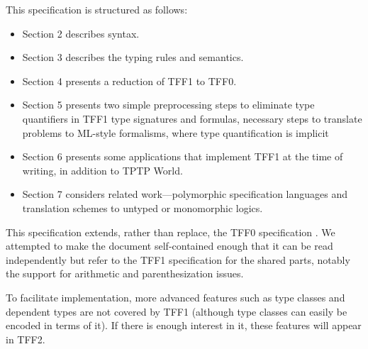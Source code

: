 This specification is structured as follows:
\begin{itemize}
\item Section 2 describes syntax.
\item Section 3 describes the typing rules and semantics.
\item Section 4 presents a reduction of TFF1 to TFF0.
\item Section 5 presents two simple preprocessing steps to eliminate type
quantifiers in TFF1 type signatures and formulas, necessary steps to translate
problems to ML-style formalisms, where type quantification is implicit
\item Section 6 presents some applications that implement TFF1 at the time of
writing, in addition to TPTP World.
\item Section 7 considers related work---polymorphic specification languages
and translation schemes to untyped or monomorphic logics.
\end{itemize}

This specification extends, rather than replace, the TFF0 specification
\cite{TFF0}. We attempted to make the document self-contained enough that it can
be read independently but refer to the TFF1 specification for the shared parts,
notably the support for arithmetic and parenthesization issues.

To facilitate implementation, more advanced features such as type classes and
dependent types are not covered by TFF1 (although type classes can easily be
encoded in terms of it). If there is enough interest in it, these features will
appear in TFF2.
